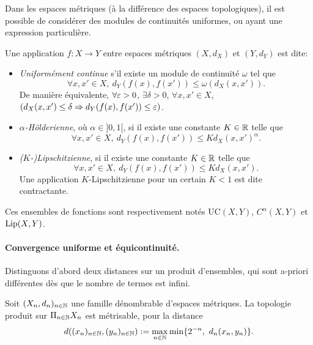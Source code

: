 Dans les espaces métriques (à la différence des   espaces topologiques), il est possible de considérer des modules de continuités uniformes, ou ayant une expression particulière. 

\begin{definition}
\label{def:unifContinu}
%
	Une application $f : X \to Y$ entre espaces métriques $(X,d_X)$ et $(Y,d_Y)$ est dite:
	\begin{itemize}
		\item \emph{Uniformément continue} s'il existe un module de continuité $\omega$ tel que 
		\begin{equation}
		\label{eq:mod_cont_unif}			
			\forall x,x' \in X,\ d_Y(f(x),f(x')) \leq \omega(d_X(x,x')).
		\end{equation}
		De manière équivalente, $\forall \varepsilon>0$, $\exists\delta>0$, $\forall x,x' \in X$, $(d_X(x,x')\leq \delta \Rightarrow d_Y(f(x),f(x')) \leq \varepsilon)$.
		\item \emph{$\alpha$-Hölderienne}, où $\alpha \in ]0,1[$, si il existe une constante $K\in \mathbb{R}$ telle que 
		$$
			\forall x,x' \in X,\ d_Y(f(x),f(x')) \leq K d_X(x,x')^\alpha.
		$$
		\item \emph{($K$-)Lipschitzienne}, si il existe une constante $K \in \mathbb{R}$ telle que 
		$$
			\forall x,x' \in X,\ d_Y(f(x),f(x')) \leq K d_X(x,x').
		$$
		Une application $K$-Lipschitzienne pour un certain $K<1$ est dite contractante. 
	\end{itemize}
	Ces ensembles de fonctions sont respectivement notés $\mathrm{UC}(X,Y)$, $C^\alpha(X,Y)$ et $\operatorname{Lip}(X,Y)$.
\end{definition}


\paragraph{Convergence uniforme et équicontinuité.}

Distinguons d'abord deux distances sur un produit d'ensembles, qui sont a-priori différentes dès que le nombre de termes est infini. 

\begin{proposition}
\label{prop:distCvSimple}
%
	Soit $(X_n,d_n)_{n \in \mathbb{N}}$ une famille dénombrable d'espaces métriques. La topologie produit sur $\Pi_{n \in \mathbb{N}} X_n$ est métrisable, pour la distance
	\begin{equation*}
		d( (x_n)_{n \in \mathbb{N}}, (y_n)_{n \in \mathbb{N}} ) := \max_{n \in \mathbb{N}} \min\{2^{-n},\ d_n(x_n,y_n)\}.
	\end{equation*}
\end{proposition}


